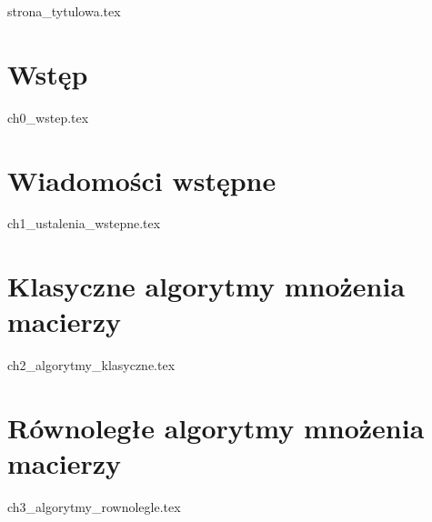 \documentclass[a4paper,oneside,leqno,12pt]{book}
\begin{document}
{strona_tytulowa.tex}
\tableofcontents

\chapter{Wstęp}
{ch0_wstep.tex}

\chapter{Wiadomości wstępne}
{ch1_ustalenia_wstepne.tex}

\chapter{Klasyczne algorytmy mnożenia macierzy}
{ch2_algorytmy_klasyczne.tex}

\chapter{Równoległe algorytmy mnożenia macierzy}
{ch3_algorytmy_rownolegle.tex}



\end{document}
